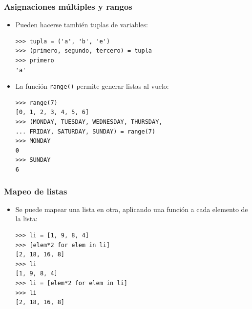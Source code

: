\documentclass{beamer}
\begin{document}
\begin{frame}[fragile]
\frametitle{Asignaciones múltiples y rangos}

\begin{itemize}
\item Pueden hacerse también tuplas de variables:
\begin{footnotesize}
\begin{verbatim}
>>> tupla = ('a', 'b', 'e')
>>> (primero, segundo, tercero) = tupla
>>> primero
'a'
\end{verbatim}
\end{footnotesize}

\item La función \verb|range()| permite generar listas al vuelo:
\begin{footnotesize}
\begin{verbatim}
>>> range(7)
[0, 1, 2, 3, 4, 5, 6]
>>> (MONDAY, TUESDAY, WEDNESDAY, THURSDAY, 
... FRIDAY, SATURDAY, SUNDAY) = range(7)
>>> MONDAY
0
>>> SUNDAY
6
\end{verbatim}
\end{footnotesize}
\end{itemize}

\end{frame}



\begin{frame}[fragile]
\frametitle{Mapeo de listas}

\begin{itemize}
\item Se puede mapear una lista en otra, aplicando una función a cada
  elemento de la lista:
  \begin{footnotesize}
\begin{verbatim}
>>> li = [1, 9, 8, 4]
>>> [elem*2 for elem in li]      
[2, 18, 16, 8]
>>> li                           
[1, 9, 8, 4]
>>> li = [elem*2 for elem in li] 
>>> li
[2, 18, 16, 8]
\end{verbatim}
  \end{footnotesize}
\end{itemize}
  
\end{frame}
\end{document}
